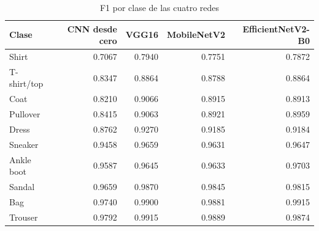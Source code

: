 \begin{table}
\caption{F1 por clase de las cuatro redes}
\label{tab:bono_f1_por_clase}
\begin{tabular}{lrrrr}
\toprule
Clase & CNN desde cero & VGG16 & MobileNetV2 & EfficientNetV2-B0 \\
\midrule
Shirt & 0.7067 & 0.7940 & 0.7751 & 0.7872 \\
T-shirt/top & 0.8347 & 0.8864 & 0.8788 & 0.8864 \\
Coat & 0.8210 & 0.9066 & 0.8915 & 0.8913 \\
Pullover & 0.8415 & 0.9063 & 0.8921 & 0.8959 \\
Dress & 0.8762 & 0.9270 & 0.9185 & 0.9184 \\
Sneaker & 0.9458 & 0.9659 & 0.9631 & 0.9647 \\
Ankle boot & 0.9587 & 0.9645 & 0.9633 & 0.9703 \\
Sandal & 0.9659 & 0.9870 & 0.9845 & 0.9815 \\
Bag & 0.9740 & 0.9900 & 0.9881 & 0.9915 \\
Trouser & 0.9792 & 0.9915 & 0.9889 & 0.9874 \\
\bottomrule
\end{tabular}
\end{table}
